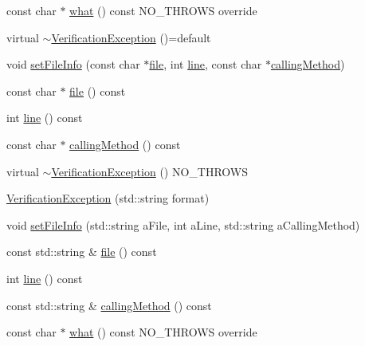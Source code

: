 \begin{DoxyCompactItemize}
\item 
const char $\ast$ \mbox{\hyperlink{structfakeit_1_1VerificationException_aba8bb8f60a0427c01868a0ab0388fd0b}{what}} () const N\+O\+\_\+\+T\+H\+R\+O\+WS override
\item 
virtual \mbox{\hyperlink{structfakeit_1_1VerificationException_a3b59826b297c4022ab36f06237daaba7}{$\sim$\+Verification\+Exception}} ()=default
\item 
void \mbox{\hyperlink{structfakeit_1_1VerificationException_a70b6c8675f005de5a0af6d4d0bee5cd4}{set\+File\+Info}} (const char $\ast$\mbox{\hyperlink{structfakeit_1_1VerificationException_a6a986aae786e9bcbe0fb523a671e5184}{file}}, int \mbox{\hyperlink{structfakeit_1_1VerificationException_a8b1f759f2f939b5f1a84aa1f8b45fd81}{line}}, const char $\ast$\mbox{\hyperlink{structfakeit_1_1VerificationException_ac64a1175b7ab81f1375ceabef824f3a8}{calling\+Method}})
\item 
const char $\ast$ \mbox{\hyperlink{structfakeit_1_1VerificationException_a6a986aae786e9bcbe0fb523a671e5184}{file}} () const
\item 
int \mbox{\hyperlink{structfakeit_1_1VerificationException_a8b1f759f2f939b5f1a84aa1f8b45fd81}{line}} () const
\item 
const char $\ast$ \mbox{\hyperlink{structfakeit_1_1VerificationException_ac64a1175b7ab81f1375ceabef824f3a8}{calling\+Method}} () const
\item 
virtual \mbox{\hyperlink{structfakeit_1_1VerificationException_aa0e95a9d61ff4d6aeb185cadb033fc93}{$\sim$\+Verification\+Exception}} () N\+O\+\_\+\+T\+H\+R\+O\+WS
\item 
\mbox{\hyperlink{structfakeit_1_1VerificationException_acd3b36e04c5069bdfa5ba9ec4c4b16bc}{Verification\+Exception}} (std\+::string format)
\item 
void \mbox{\hyperlink{structfakeit_1_1VerificationException_a4b0bc0c4ef705187fc836a6d0762e19e}{set\+File\+Info}} (std\+::string a\+File, int a\+Line, std\+::string a\+Calling\+Method)
\item 
const std\+::string \& \mbox{\hyperlink{structfakeit_1_1VerificationException_a6accc65751a7d8025062e9c56f5656fd}{file}} () const
\item 
int \mbox{\hyperlink{structfakeit_1_1VerificationException_a8b1f759f2f939b5f1a84aa1f8b45fd81}{line}} () const
\item 
const std\+::string \& \mbox{\hyperlink{structfakeit_1_1VerificationException_aea0cb7b486b1fd95f80138cef5759953}{calling\+Method}} () const
\item 
const char $\ast$ \mbox{\hyperlink{structfakeit_1_1VerificationException_aba8bb8f60a0427c01868a0ab0388fd0b}{what}} () const N\+O\+\_\+\+T\+H\+R\+O\+WS override
\end{DoxyCompactItemize}
